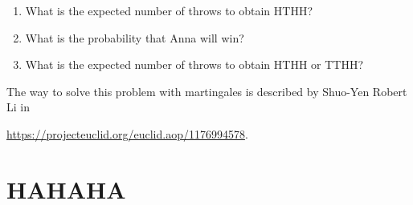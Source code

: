 \documentclass[12pt]{article}
\begin{document}
\begin{enumerate}
\begin{enumerate}
  \item What is the expected number of throws to obtain HTHH? 
  \item What is the probability that Anna will win?
  \item What is the expected number of throws to obtain HTHH or TTHH?
\end{enumerate}

The way to solve this problem with martingales is described by Shuo-Yen Robert Li in 

\url{https://projecteuclid.org/euclid.aop/1176994578}.

\end{enumerate}





\newpage
\section{HAHAHA}
\end{document}
